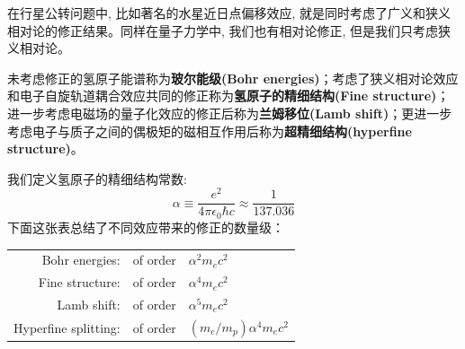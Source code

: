 \documentclass[a4paper,zihao=-4,linespread=1]{ctexrep}
\begin{document}
    在行星公转问题中, 比如著名的水星近日点偏移效应, 就是同时考虑了广义和狭义相对论的修正结果。同样在量子力学中, 我们也有相对论修正, 但是我们只考虑狭义相对论。
    
    未考虑修正的氢原子能谱称为\textbf{玻尔能级(Bohr energies)}；考虑了狭义相对论效应和电子自旋轨道耦合效应共同的修正称为\textbf{氢原子的精细结构(Fine structure)}；
    进一步考虑电磁场的量子化效应的修正后称为\textbf{兰姆移位(Lamb shift)}；更进一步考虑电子与质子之间的偶极矩的磁相互作用后称为\textbf{超精细结构(hyperfine structure)}。
    
    我们定义氢原子的精细结构常数:
    \begin{equation}
        \boxed{\alpha\equiv\frac{e^2}{4\pi \epsilon_0\hbar c}\approx\frac{1}{137.036}}
    \end{equation}
    下面这张表总结了不同效应带来的修正的数量级：
    \begin{center}
        \begin{tabular}{|rll|}
            \hline Bohr energies: & of order & $\alpha^2 m_e c^2$ \\
            Fine structure: & of order & $\alpha^4 m_e c^2$ \\
            Lamb shift: & of order & $\alpha^5 m_e c^2$ \\
            Hyperfine splitting: & of order & $(m_e / m_p) \alpha^4 m_e c^2$ \\
            \hline
        \end{tabular}
    \end{center}
    
\end{document}
